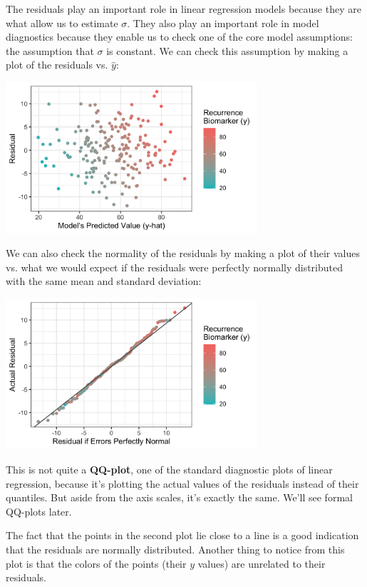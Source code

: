 The residuals play an important role in linear regression models because they are what allow us to estimate $\sigma$. They also play an important role in model diagnostics because they enable us to check one of the core model assumptions: the assumption that $\sigma$ is constant. We can check this assumption by making a plot of the residuals vs. $\hat{y}$:
\begin{center}
\includegraphics[width=0.7\textwidth]{img/linreg-example-residual-vs-fitted.png}
\end{center}
We can also check the normality of the residuals by making a plot of their values vs. what we would expect if the residuals were perfectly normally distributed with the same mean and standard deviation:
\begin{center}
\includegraphics[width=0.7\textwidth]{img/linreg-example-almost-qq-plot.png}
\end{center}
This is not quite a \textbf{QQ-plot}, one of the standard diagnostic plots of linear regression, because it's plotting the actual values of the residuals instead of their quantiles. But aside from the axis scales, it's exactly the same. We'll see formal QQ-plots later. 

The fact that the points in the second plot lie close to a line is a good indication that the residuals are normally distributed. Another thing to notice from this plot is that the colors of the points (their $y$ values) are unrelated to their residuals. 
\vspace{5mm}

